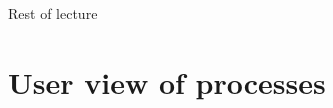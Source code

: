 \documentclass[11pt,aspectratio=169]{beamer}
\begin{document}

\begin{slide}{Rest of lecture}
\end{slide}

\section{User view of processes}
\end{document}
